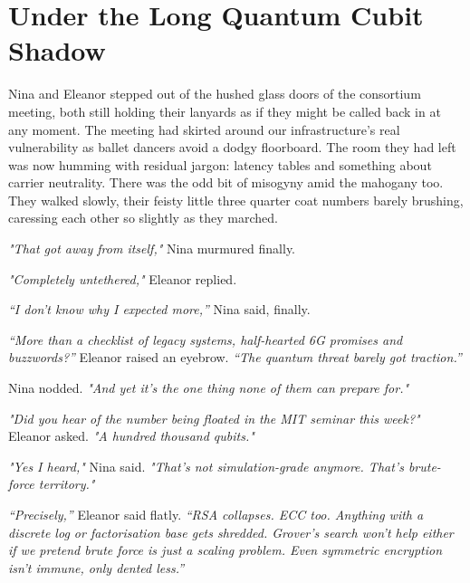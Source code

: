 \newpage

\noindent
\section*{Under the Long Quantum Cubit Shadow}

Nina and Eleanor stepped out of the hushed glass doors of the consortium meeting, both still holding their lanyards as if they might be called back in at any moment. The meeting had skirted around our infrastructure's real vulnerability as ballet dancers avoid a dodgy floorboard. The room they had left was now humming with residual jargon: latency tables and something about carrier neutrality. There was the odd bit of misogyny amid the mahogany too. They walked slowly, their feisty little three quarter coat numbers barely brushing, caressing each other so slightly as they marched. 

\smallskip


\textit{"That got away from itself,"} Nina murmured finally.

\textit{"Completely untethered,"} Eleanor replied. 

\textit{``I don't know why I expected more,''} Nina said, finally.

\textit{``More than a checklist of legacy systems, half-hearted 6G promises and buzzwords?''} Eleanor raised an eyebrow. \textit{``The quantum threat barely got traction.''}

\smallskip

Nina nodded. \textit{"And yet it's the one thing none of them can prepare for."}

\textit{"Did you hear of the number being floated in the MIT seminar this week?"} Eleanor asked. \textit{"A hundred thousand qubits."}

\smallskip

\textit{"Yes I heard,"} Nina said. \textit{"That’s not simulation-grade anymore. That’s brute-force territory."}


\textit{``Precisely,''} Eleanor said flatly. \textit{``RSA collapses. ECC too. Anything with a discrete log or factorisation base gets shredded. Grover’s search won’t help either if we pretend brute force is just a scaling problem. Even symmetric encryption isn’t immune, only dented less.''}

